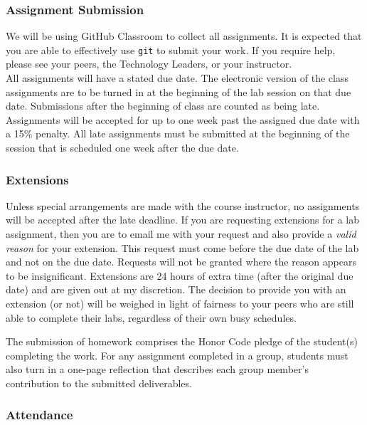 \documentclass[11pt]{article} %
\begin{document}
\subsubsection*{Assignment Submission}

We will be using GitHub Classroom to collect all assignments. It is expected that you are able to effectively use {\tt git} to submit your work. If you require help, please see your peers, the Technology Leaders, or your instructor.\\

All assignments will have a stated due date. \color{red} The electronic version of the class assignments are to be turned in at the beginning of the lab session on that due date. Submissions after the beginning of class are counted as being late.  Assignments will be accepted for up to one week past the assigned due date with a 15\% penalty. \color{black} All late assignments must be submitted at the beginning of the session that is scheduled one week after the due date. 



\subsubsection*{\textbf{Extensions}}
Unless special arrangements are made with the course instructor, no assignments will be accepted after the late deadline. If you are requesting extensions for a lab assignment, then you are to email me with your request and also provide a \emph{valid reason} for your extension. This request must come before the due date of the lab and not on the due date. Requests will not be granted where the reason appears to be insignificant. Extensions are 24 hours of extra time (after the original due date) and are given out at my discretion. The decision to provide you with an extension (or not) will be weighed in light of fairness to your peers who are still able to complete their labs, regardless of their own busy schedules. 

The submission of homework comprises the Honor Code pledge of the student(s) completing the work. For any assignment completed in a group, students must also turn in a one-page reflection that describes each group member's contribution to the submitted deliverables.  


\subsubsection*{\textbf{Attendance}}
\end{document}
